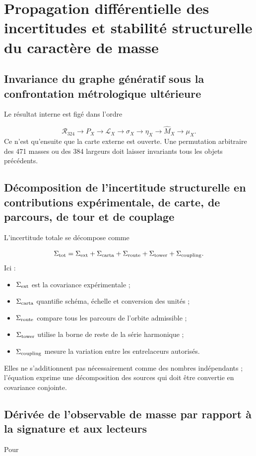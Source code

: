 \section{Propagation différentielle des incertitudes et stabilité structurelle du caractère de masse}
\subsection{Invariance du graphe génératif sous la confrontation métrologique ultérieure}
Le résultat interne est figé dans l'ordre

\[
 \mathcal R_{324}
 \to P_X
 \to\mathcal L_X
 \to\sigma_X
 \to\eta_X
 \to\widehat M_X
 \to\mu_X.
\]
Ce n'est qu'ensuite que la carte externe est ouverte. Une permutation arbitraire des 471 masses ou des 384 largeurs doit laisser invariants tous les objets précédents.

\subsection{Décomposition de l'incertitude structurelle en contributions expérimentale, de carte, de parcours, de tour et de couplage}
L'incertitude totale se décompose comme

\[
 \Sigma_{\rm tot}
 =\Sigma_{\rm ext}
 +\Sigma_{\rm carta}
 +\Sigma_{\rm route}
 +\Sigma_{\rm tower}
 +\Sigma_{\rm coupling}.
\]
Ici :

\begin{itemize}
\item \(\Sigma_{\rm ext}\) est la covariance expérimentale ;
\item \(\Sigma_{\rm carta}\) quantifie schéma, échelle et conversion des unités ;
\item \(\Sigma_{\rm route}\) compare tous les parcours de l'orbite admissible ;
\item \(\Sigma_{\rm tower}\) utilise la borne de reste de la série harmonique ;
\item \(\Sigma_{\rm coupling}\) mesure la variation entre les entrelaceurs autorisés.
\end{itemize}
Elles ne s'additionnent pas nécessairement comme des nombres indépendants ; l'équation exprime une décomposition des sources qui doit être convertie en covariance conjointe.

\subsection{Dérivée de l'observable de masse par rapport à la signature et aux lecteurs}
Pour

